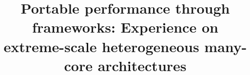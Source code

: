 \documentclass[conference]{IEEEtran}
\begin{document}
%
\title{Portable performance through frameworks: Experience on
extreme-scale heterogeneous many-core architectures}







\end{document}
